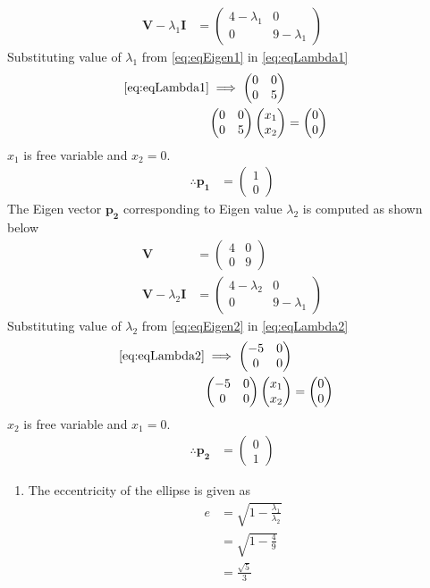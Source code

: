 \documentclass[12pt]{article}
\newcommand{\myvec}[1]{\ensuremath{\begin{pmatrix}#1\end{pmatrix}}}
\let\vec\mathbf
\begin{document}
\begin{enumerate}
\begin{align}
	\label{eq:eqLambda1}
	\vec{V}-\lambda_1\vec{I} &= \myvec{ 4 - \lambda_1 & 0 \\ 0 & 9-\lambda_1} 
\end{align}
Substituting value of $\lambda_1$ from \eqref{eq:eqEigen1} in \eqref{eq:eqLambda1}
\begin{align}
	\eqref{eq:eqLambda1} \implies  \myvec{  0 & 0 \\ 0 & 5}  \\
	\myvec{  0 & 0 \\ 0 & 5}\myvec{x_1 \\ x_2} &= \myvec{0 \\0} 
\end{align}
$x_1$ is free variable and $x_2 = 0$. \\
\begin{align}
	\therefore \vec{p_1} &= \myvec{1 \\ 0}
\end{align}
The Eigen vector $\vec{p_2}$ corresponding to Eigen value $\lambda_2$ is computed as shown below
\begin{align}
	\vec{V} &= \myvec{ 4 & 0 \\ 0 & 9} \\
	\label{eq:eqLambda2}
	\vec{V}-\lambda_2\vec{I} &= \myvec{ 4 - \lambda_2 & 0 \\ 0 & 9-\lambda_1} 
\end{align}
Substituting value of $\lambda_2$ from \eqref{eq:eqEigen2} in \eqref{eq:eqLambda2}
\begin{align}
	\eqref{eq:eqLambda2} \implies  \myvec{ -5 & 0 \\ 0 & 0}  \\
	\myvec{  -5 & 0 \\ 0 & 0}\myvec{x_1 \\ x_2} &= \myvec{0 \\0} 
\end{align}
$x_2$ is free variable and $x_1 = 0$. \\
\begin{align}
	\therefore \vec{p_2} &= \myvec{0 \\ 1}
\end{align}
\begin{enumerate}
\item The eccentricity of the ellipse is given as  
\begin{align}
	e &= \sqrt{1-\frac{\lambda_1}{\lambda_2}} \\
	  &= \sqrt{1-\frac{4}{9}} \\
          &= \frac{\sqrt{5}}{3}

\end{align}
\end{enumerate}
\end{enumerate}
\end{document}
